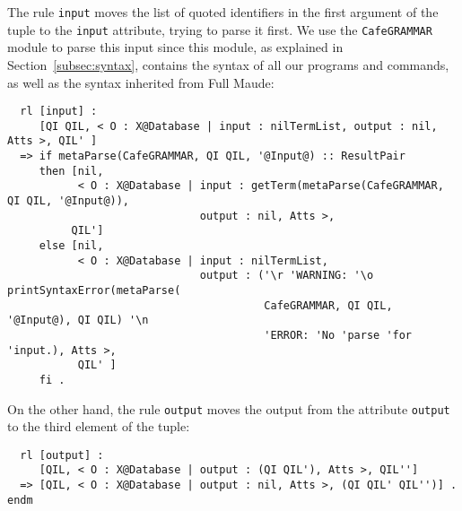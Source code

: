 The rule \verb"input" moves the list of quoted identifiers in the first argument of the
tuple to the \verb"input" attribute, trying to parse it first. We use the
\verb"CafeGRAMMAR" module to parse this input since this module, as explained in
Section~\ref{subsec:syntax}, contains the syntax of all our programs and commands,
as well as the syntax inherited from Full Maude:

{\codesize
\begin{verbatim}
  rl [input] :
     [QI QIL, < O : X@Database | input : nilTermList, output : nil, Atts >, QIL' ]
  => if metaParse(CafeGRAMMAR, QI QIL, '@Input@) :: ResultPair
     then [nil,
           < O : X@Database | input : getTerm(metaParse(CafeGRAMMAR, QI QIL, '@Input@)),
                              output : nil, Atts >,
          QIL']
     else [nil,
           < O : X@Database | input : nilTermList,
                              output : ('\r 'WARNING: '\o printSyntaxError(metaParse(
                                        CafeGRAMMAR, QI QIL, '@Input@), QI QIL) '\n
                                        'ERROR: 'No 'parse 'for 'input.), Atts >,
           QIL' ]
     fi .
\end{verbatim}
}

On the other hand, the rule \verb"output" moves the output from the attribute
\verb"output" to the third element of the tuple:

{\codesize
\begin{verbatim}
  rl [output] :
     [QIL, < O : X@Database | output : (QI QIL'), Atts >, QIL'']
  => [QIL, < O : X@Database | output : nil, Atts >, (QI QIL' QIL'')] .
endm
\end{verbatim}
}
{\codesize
\begin{comment}
set print conceal on .

print conceal mod_is_sorts_._____endm .
print conceal fmod_is_sorts_.____endfm .
print conceal db .


*** trace exclude CAFE2MAUDE .
set show loop stats off .
set show loop timing off .

\end{comment}
}
